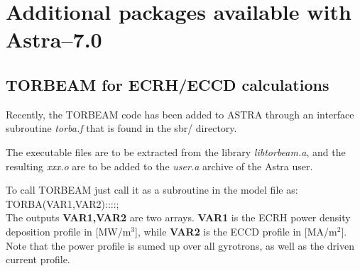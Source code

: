 
\section{Additional packages available with Astra--7.0}
%
\subsection{TORBEAM for ECRH/ECCD calculations}
Recently, the TORBEAM code has been added to ASTRA through an
interface subroutine \textit{torba.f} that is found in the sbr/ directory. 

The executable files are to be extracted from the library {\it libtorbeam.a}, 
and the resulting {\it xxx.o} are to be added to the {\it user.a} archive of 
the Astra user. 

To call TORBEAM just call it as a subroutine in the model file as:
\\

TORBA(VAR1,VAR2)::::;
\\

The outputs {\bf VAR1,VAR2} are two arrays. {\bf VAR1} is the ECRH power density
deposition profile in [MW/m$^3$], while {\bf VAR2} is the ECCD profile in 
[MA/m$^2$]. Note that the power profile is sumed up over all gyrotrons, as well 
as the driven current profile.

